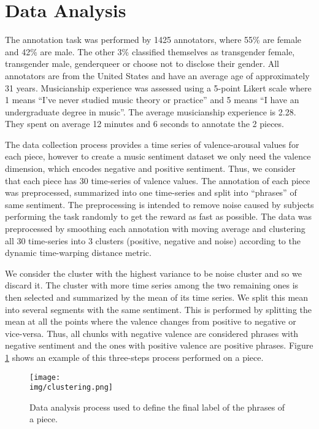 \section{Data Analysis}
\label{sec:data_analysys}

The annotation task was performed by 1425 annotators, where 55\% are female and 42\%
are male. The other 3\% classified themselves as transgender female,
transgender male, genderqueer or choose not to disclose their gender.
All annotators are from the United States and have an average age of approximately 31 years.
Musicianship experience was assessed using a 5-point Likert scale where 1 means
``I've never studied music theory or practice'' and 5 means ``I have an undergraduate
degree in music''. The average musicianship experience is 2.28. They spent on average
12 minutes and 6 seconds to annotate the 2 pieces.

The data collection process provides a time series of valence-arousal values for
each piece, however to create a music sentiment dataset we only need the valence
dimension, which encodes negative and positive sentiment.
Thus, we consider that each piece has 30 time-series of valence values. The
annotation of each piece was preprocessed,
summarized into one time-series and split into ``phrases''
of same sentiment. The preprocessing is intended to remove
noise caused by subjects performing the
task randomly to get the reward as fast as possible.
The data was preprocessed by smoothing each annotation with moving average
and clustering all 30 time-series into 3 clusters (positive, negative and noise)
according to the dynamic time-warping distance metric.

We consider the cluster with the highest variance to be noise cluster and so we
discard it. The cluster with more time series among the two remaining ones is
then selected and summarized by the mean of its time series.
We split this mean into several segments with the same sentiment.
This is performed by splitting the
mean at all the points where the valence changes
from positive to negative or vice-versa. Thus,
all chunks with negative valence are considered phrases
with negative sentiment and the ones with positive valence are positive
phrases. Figure \ref{fig:clustering} shows an example of this three-steps process
performed on a piece.

\begin{figure}
 \centering
 \texttt{[image: \\img/clustering.png]}
 \caption{Data analysis process used to define the final label of the phrases of a piece. }
 \label{fig:clustering}
\end{figure}


